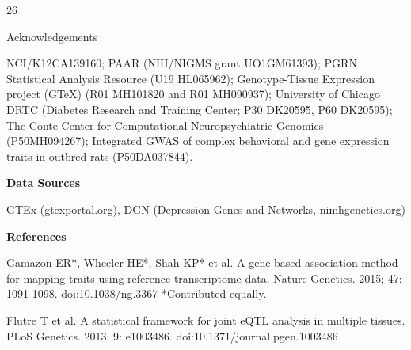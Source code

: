 \documentclass[final]{beamer}
\newcommand{\ColWidth}{26}
\begin{document}
\begin{frame}{}
\begin{textblock}{\ColWidth}
\begin{block}{Acknowledgements}
\begin{tiny}

NCI/K12CA139160; PAAR (NIH/NIGMS grant UO1GM61393); PGRN Statistical Analysis Resource (U19 HL065962); Genotype-Tissue Expression project (GTeX) (R01 MH101820 and R01 MH090937); University of Chicago DRTC (Diabetes Research and Training Center; P30 DK20595, P60 DK20595); The Conte Center for Computational Neuropsychiatric Genomics (P50MH094267); Integrated GWAS of complex behavioral and gene expression traits in outbred rats (P50DA037844).\\

\bigskip

\textbf{Data Sources}

GTEx (\url{gtexportal.org}), DGN (Depression Genes and Networks, \url{nimhgenetics.org})

\bigskip

\textbf{References}

Gamazon ER*, Wheeler HE*, Shah KP* et al. A gene-based association method for mapping traits using reference transcriptome data. Nature Genetics. 2015; 47: 1091-1098. doi:10.1038/ng.3367 *Contributed equally.

\bigskip

Flutre T et al. A statistical framework for joint eQTL analysis in multiple tissues. PLoS Genetics. 2013; 9: e1003486. doi:10.1371/journal.pgen.1003486

\end{tiny}


\end{block}

\end{textblock}



\end{frame}
\end{document}
